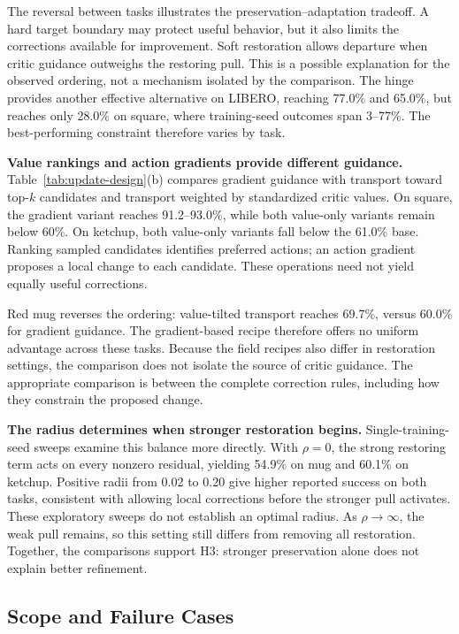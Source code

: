 The reversal between tasks illustrates the preservation--adaptation
tradeoff. A hard target boundary may protect useful behavior, but it also
limits the corrections available for improvement. Soft restoration allows
departure when critic guidance outweighs the restoring pull. This is a
possible explanation for the observed ordering, not a mechanism isolated
by the comparison. The hinge provides another effective alternative on
LIBERO, reaching 77.0\% and 65.0\%, but reaches only 28.0\% on square,
where training-seed outcomes span 3--77\%. The best-performing constraint therefore varies by task.

\textbf{Value rankings and action gradients provide different guidance.}
Table~\ref{tab:update-design}(b) compares gradient guidance with transport
toward top-$k$ candidates and transport weighted by standardized critic
values. On square, the gradient variant reaches 91.2--93.0\%, while both
value-only variants remain below 60\%. On ketchup, both value-only
variants fall below the 61.0\% base. Ranking sampled candidates identifies
preferred actions; an action gradient proposes a local change to each
candidate. These operations need not yield equally useful corrections.

Red mug reverses the ordering: value-tilted transport reaches 69.7\%,
versus 60.0\% for gradient guidance. The gradient-based recipe therefore
offers no uniform advantage across these tasks. Because the field recipes also
differ in restoration settings, the comparison does not isolate the source
of critic guidance. The appropriate comparison is between the complete
correction rules, including how they constrain the proposed change.

\textbf{The radius determines when stronger restoration begins.}
Single-training-seed sweeps examine this balance more directly. With
$\rho=0$, the strong restoring term acts on every nonzero residual,
yielding 54.9\% on mug and 60.1\% on ketchup. Positive radii from
0.02 to 0.20 give higher reported success on both tasks, consistent with
allowing local corrections before the stronger pull activates. These
exploratory sweeps do not establish an optimal radius. As
$\rho\to\infty$, the weak pull remains, so this setting still differs
from removing all restoration. Together, the comparisons support H3:
stronger preservation alone does not explain better refinement.

\subsection{Scope and Failure Cases}
\label{sec:exp-dmc}


